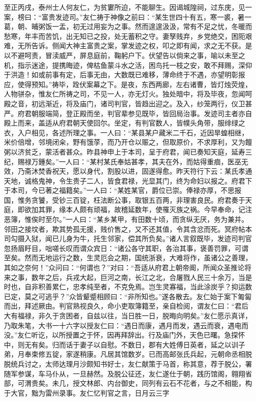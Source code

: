 \documentclass[a4paper,12pt,UTF8,twoside]{ctexbook}
\begin{document}
至正丙戌，泰州士人何友仁，为贫寠所迫，不能聊生。因谒城隍祠，过东庑，见一案，榜曰：“富贵发迹司。”友仁祷于神像之前曰：“某生世四十有五，寒一裘，暑一葛，朝、晡粥饭一盂，初无过用妄为之事。然而遑遑汲汲，常有不足之忧，冬暖而愁寒，年丰而苦饥，出无知已之投，处无蓄积之守。妻孥贱弃，乡党绝交，困阨艰难，无所告诉。侧闻大神主富贵之案，掌发迹之权，叩之即有闻，求之无不获。是以不避呵责，冒渎威严，屏息庭前，鞠躬户下。伏望告以倘来之事，喻以未至之机，指示迷途，提携晦迹，俾枯鱼蒙斗水之活，困鸟托一枝之安，敢不拜赐，深仰于洪造！如或前事有定，后事无由，大数既已难移，薄命终于不遇，亦望明彰报应，使得预知。”祷毕，跧伏案幕之下。是夜，东西两廊，左右诸曹，皆灯烛荧煌，人物骈杂，惟友仁所祷之司，不见一人，亦无灯火。独处暗中，将及毕夜，忽闻呵殿之音，初远渐近，将及庙门，诸司判官，皆趋出迎之。及入，纱笼两行，仪卫甚严。府君朝服端简，登正殿而坐，判官辈参见既毕，皆回局治事。发迹司主者亦自殿上而来，盖适从府君朝天使回尔。坐定，有判官数人，皆幞头角带，服绯绿之衣，入户相见，各述所理之事。一人曰：“某县某户藏米二千石，近因旱蝗相继，米价倍增，邻境闭籴，野有饿莩，而乃开仓以赈之，但取原价，不求厚利，又为饘粥以济贫乏，蒙活者甚众。昨县神申上于本司，呈于府君，闻已奏知天庭，延寿三纪，赐禄万鍾矣。”一人曰：“某村某氏奉姑甚孝，其夫在外，而姑得重痼，医巫无效，乃斋沐焚香祝天，愿以身代，割股以进，固遂得愈。昨天符行下云：某氏孝通天地，诚格鬼神，令生贵子二人，皆食君禄，光显其门，终为命妇以报之。府君下于本司，今已著之福籍矣。”一人曰：“某姓某官，爵位已崇。俸禄亦厚，不思报国，惟务贪饕，受钞三百锭，枉法断公事，取银五百两，非理害良民。府君奏于天庭，即欲加其罪，缘本人颇有顽福，故稽延数年，使罹灭族之祸。今早奉命，记注恶簿，惟俟时至尔。”一人曰：“某乡某甲，有田数十顷，而贪纵无厌，务为兼并。邻田之接坟者，欺其势孤无援，贱价售之，又不还其值，令其含忿而死。冥府帖本司勾摄入狱，闻已儿身为牛，托生邻家，偿其所负矣。”诸人言叙既毕，发迹司判官忽扬眉盱目，咄嗟长叹而谓众宾日：“诸公各守其职，各治其事，褒善罚罪，可谓至矣。然而无地运行之数，生灵厄会之期，国统浙衰，大难将作，虽诸公之善理，其如之奈何！”众问曰：“何谓也？”对曰：“吾适从府君上朝帝阍，所闻众圣推论将来之事，数年之后，兵戎大起，巨河之南，长江之北，合屠戮人民三十余万，当是时也，自非积善累仁，忠孝纯至者，不克免焉。岂生灵寡福，当此涂炭乎？抑运数已定，莫之可逃乎？”众皆颦蹙相顾曰：“非所知也。”遂各散去。友仁始于案下匍匐而出，拜述厥由。判官熟视良久，命小吏取簿籍至，亲自检阅，谓友仁曰：“君后大有福禄，非久于贪困者，自兹以往，当日胜一日，脱晦向明矣。”友仁愿示真详，乃取朱笔，大书一十六字以授友仁曰：“遇日而康，遇月而发，遇云而衰，遇电而没。”友仁听讫，以所授置之于怀，因再拜辞出。行及庙门外，天色已曙。急探怀中，则无有矣。归而话于妻子以自慰。不数日，郡有大姓傅日英者，延之以训子弟，月奉束修五锭，家遂稍康。凡居其馆数岁。已而高邮张氏兵起，元朝命丞相脱脱统兵讨之，太师达理月沙颇知书好士，友仁献策于马首，称其意，荐于脱公，署随军参谋，车马仆从，一旦赫然。及脱公征还，友仁遂仕于朝，践历馆阁，翱翔省部，可渭贵矣。未几，授文林郎、内台御史，同列有云石不花者，与之不相能，构于大官，黜为雷州录事。友仁忆判官之言，日月云三字
\end{document}
